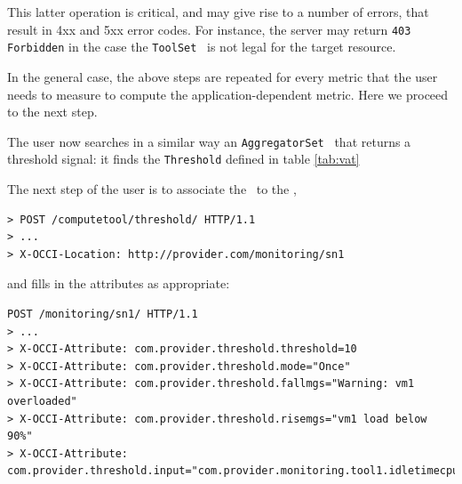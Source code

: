 \documentclass[12pt]{article}  %
\begin{document}
This latter operation is critical, and may give rise to a number of errors, that result in 4xx and 5xx error codes. For instance, the server may return {\tt 403 Forbidden} in the case the {\tt ToolSet} \mi\ is not legal for the target resource.

In the general case, the above steps are repeated for every metric that the user needs to measure to compute the application-dependent metric. Here we proceed to the next step. 

The user now searches in a similar way an {\tt AggregatorSet} \mi\ that returns a threshold signal: it finds the {\tt Threshold} defined in table \ref{tab:vat}

\begin{table}
\scriptsize
{}

\caption{Attributes defined for the {\tt threshold} mixin \label{tab:vat}}
\end {table}

The next step of the user is to associate the \sens\ to the \mi,

\begin{verbatim}
> POST /computetool/threshold/ HTTP/1.1
> ...
> X-OCCI-Location: http://provider.com/monitoring/sn1
\end{verbatim}
 
and fills in the attributes as appropriate:

\begin{verbatim}
POST /monitoring/sn1/ HTTP/1.1
> ...
> X-OCCI-Attribute: com.provider.threshold.threshold=10
> X-OCCI-Attribute: com.provider.threshold.mode="Once"
> X-OCCI-Attribute: com.provider.threshold.fallmgs="Warning: vm1 overloaded"
> X-OCCI-Attribute: com.provider.threshold.risemgs="vm1 load below 90%"
> X-OCCI-Attribute: com.provider.threshold.input="com.provider.monitoring.tool1.idletimecpu"
\end{verbatim}
\end{document}
